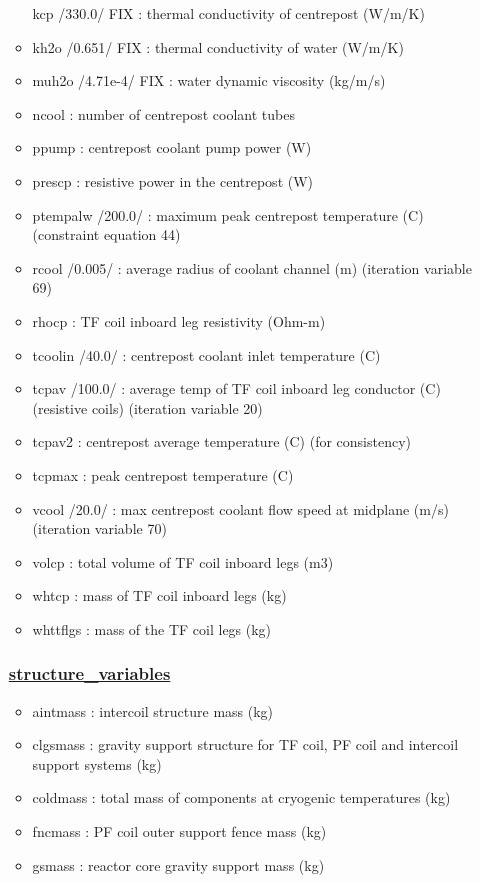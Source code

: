 \documentclass[
]{article}
\providecommand{\tightlist}{%
  \setlength{\itemsep}{0pt}\setlength{\parskip}{0pt}}
\begin{document}
\begin{itemize}
\begin{itemize}
    kcp /330.0/ FIX : thermal conductivity of centrepost (W/m/K)
  \item
    kh2o /0.651/ FIX : thermal conductivity of water (W/m/K)
  \item
    muh2o /4.71e-4/ FIX : water dynamic viscosity (kg/m/s)
  \item
    ncool : number of centrepost coolant tubes
  \item
    ppump : centrepost coolant pump power (W)
  \item
    prescp : resistive power in the centrepost (W)
  \item
    ptempalw /200.0/ : maximum peak centrepost temperature (C)
    (constraint equation 44)
  \item
    rcool /0.005/ : average radius of coolant channel (m) (iteration
    variable 69)
  \item
    rhocp : TF coil inboard leg resistivity (Ohm-m)
  \item
    tcoolin /40.0/ : centrepost coolant inlet temperature (C)
  \item
    tcpav /100.0/ : average temp of TF coil inboard leg conductor (C)
    (resistive coils) (iteration variable 20)
  \item
    tcpav2 : centrepost average temperature (C) (for consistency)
  \item
    tcpmax : peak centrepost temperature (C)
  \item
    vcool /20.0/ : max centrepost coolant flow speed at midplane (m/s)
    (iteration variable 70)
  \item
    volcp : total volume of TF coil inboard legs (m3)
  \item
    whtcp : mass of TF coil inboard legs (kg)
  \item
    whttflgs : mass of the TF coil legs (kg)
  \end{itemize}

  \hypertarget{structure_variables}{%
  \subsubsection{\texorpdfstring{\href{structure_variables.html}{structure\_variables}}{structure\_variables}}\label{structure_variables}}

  \begin{itemize}
  \tightlist
  \item
    aintmass : intercoil structure mass (kg)
  \item
    clgsmass : gravity support structure for TF coil, PF coil and
    intercoil support systems (kg)
  \item
    coldmass : total mass of components at cryogenic temperatures (kg)
  \item
    fncmass : PF coil outer support fence mass (kg)
  \item
    gsmass : reactor core gravity support mass (kg)
  \end{itemize}


\end{itemize}
\end{document}
